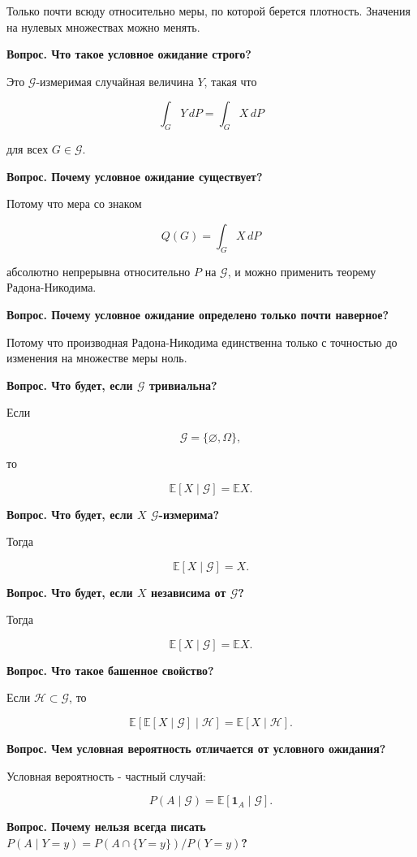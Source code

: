 \documentclass[
  11pt,
  a4paper,
]{article}
\begin{document}
Только почти всюду относительно меры, по которой берется плотность.
Значения на нулевых множествах можно менять.

\textbf{Вопрос. Что такое условное ожидание строго?}

Это \(\mathcal G\)-измеримая случайная величина \(Y\), такая что

\[
\int_GY\,dP=\int_GX\,dP
\]

для всех \(G\in\mathcal G\).

\textbf{Вопрос. Почему условное ожидание существует?}

Потому что мера со знаком

\[
Q(G)=\int_GX\,dP
\]

абсолютно непрерывна относительно \(P\) на \(\mathcal G\), и можно
применить теорему Радона-Никодима.

\textbf{Вопрос. Почему условное ожидание определено только почти
наверное?}

Потому что производная Радона-Никодима единственна только с точностью до
изменения на множестве меры ноль.

\textbf{Вопрос. Что будет, если \(\mathcal G\) тривиальна?}

Если

\[
\mathcal G=\{\varnothing,\Omega\},
\]

то

\[
\mathbb E[X\mid\mathcal G]=\mathbb EX.
\]

\textbf{Вопрос. Что будет, если \(X\) \(\mathcal G\)-измерима?}

Тогда

\[
\mathbb E[X\mid\mathcal G]=X.
\]

\textbf{Вопрос. Что будет, если \(X\) независима от \(\mathcal G\)?}

Тогда

\[
\mathbb E[X\mid\mathcal G]=\mathbb EX.
\]

\textbf{Вопрос. Что такое башенное свойство?}

Если \(\mathcal H\subset\mathcal G\), то

\[
\mathbb E[\mathbb E[X\mid\mathcal G]\mid\mathcal H]
=
\mathbb E[X\mid\mathcal H].
\]

\textbf{Вопрос. Чем условная вероятность отличается от условного
ожидания?}

Условная вероятность - частный случай:

\[
P(A\mid\mathcal G)=\mathbb E[\mathbf 1_A\mid\mathcal G].
\]

\textbf{Вопрос. Почему нельзя всегда писать
\(P(A\mid Y=y)=P(A\cap\{Y=y\})/P(Y=y)\)?}
\end{document}
